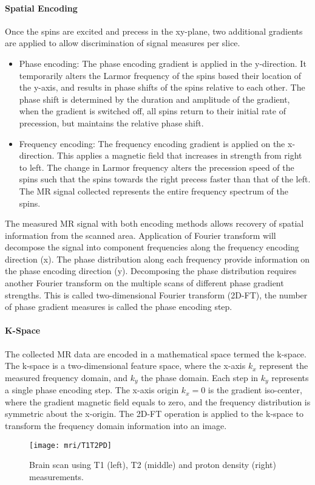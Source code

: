 \paragraph{Spatial Encoding}
Once the spins are excited and precess in the xy-plane, two additional gradients are applied to allow discrimination of signal measures per slice. 

\begin{itemize}
\item Phase encoding: The phase encoding gradient is applied in the y-direction. It temporarily alters the Larmor frequency of the spins based their location of the y-axis, and results in phase shifts of the spins relative to each other. The phase shift is determined by the duration and amplitude of the gradient, when the gradient is switched off, all spins return to their initial rate of precession, but maintains the relative phase shift. 
\item Frequency encoding: The frequency encoding gradient is applied on the x-direction. This applies a magnetic field that increases in strength from right to left. The change in Larmor frequency alters the precession speed of the spins such that the spins towards the right precess faster than that of the left. The MR signal collected represents the entire frequency spectrum of the spins. 
\end{itemize}

The measured MR signal with both encoding methods allows recovery of spatial information from the scanned area. Application of Fourier transform will decompose the signal into component frequencies along the frequency encoding direction (x). The phase distribution along each frequency provide information on the phase encoding direction (y). Decomposing the phase distribution requires another Fourier transform on the multiple scans of different phase gradient strengths. This is called two-dimensional Fourier transform (2D-FT), the number of phase gradient measures is called the phase encoding step. 

\paragraph{K-Space}

The collected MR data are encoded in a mathematical space termed the k-space. The k-space is a two-dimensional feature space, where the x-axis $k_x$ represent the measured frequency domain, and $k_y$ the phase domain. Each step in $k_y$ represents a single phase encoding step. The x-axis origin $k_x=0$ is the gradient iso-center, where the gradient magnetic field equals to zero, and the frequency distribution is symmetric about the x-origin. The 2D-FT operation is applied to the k-space to transform the frequency domain information into an image. 

\begin{figure}[htb]
\begin{center}
\texttt{[image: mri/T1T2PD]}
\caption{Brain scan using T1 (left), T2 (middle) and proton density (right) measurements.}
\label{fig:T1T2PD}
\end{center}

\end{figure}
